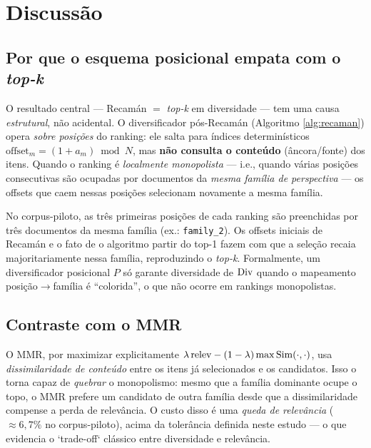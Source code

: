 \section{Discussão}
\label{sec:discussao}

\subsection{Por que o esquema posicional empata com o \emph{top-k}}

O resultado central — Recamán $=$ \emph{top-k} em diversidade — tem uma causa
\emph{estrutural}, não acidental. O diversificador pós-Recamán (Algoritmo
\ref{alg:recaman}) opera \emph{sobre posições} do ranking: ele salta para índices
determinísticos $\mathrm{offset}_m = (1+a_m)\bmod N$, mas \textbf{não consulta o
conteúdo} (âncora/fonte) dos itens. Quando o ranking é \emph{localmente
monopolista} — i.e., quando várias posições consecutivas são ocupadas por
documentos da \emph{mesma família de perspectiva} — os offsets que caem nessas
posições selecionam novamente a mesma família.

No corpus-piloto, as três primeiras posições de cada ranking são preenchidas por
três documentos da mesma família (ex.: \texttt{family\_2}). Os offsets iniciais
de Recamán e o fato de o algoritmo partir do top-1 fazem com que a seleção recaia
majoritariamente nessa família, reproduzindo o \emph{top-k}. Formalmente, um
diversificador posicional $P$ só garante diversidade de $\mathrm{Div}$ quando o mapeamento
posição$\to$família é ``colorida'', o que não ocorre em rankings monopolistas.

\subsection{Contraste com o MMR}

O MMR, por maximizar explicitamente
$\lambda\,\mathrm{relev} - (1-\lambda)\max\mathrm{Sim}(\cdot,\cdot)$, usa \emph{dissimilaridade de
conteúdo} entre os itens já selecionados e os candidatos. Isso o torna capaz de
\emph{quebrar} o monopolismo: mesmo que a família dominante ocupe o topo, o MMR
prefere um candidato de outra família desde que a dissimilaridade compense a perda
de relevância. O custo disso é uma \emph{queda de relevância} ($\approx 6{,}7\%$ no
corpus-piloto), acima da tolerância definida neste estudo — o que evidencia o
`trade-off` clássico entre diversidade e relevância.


